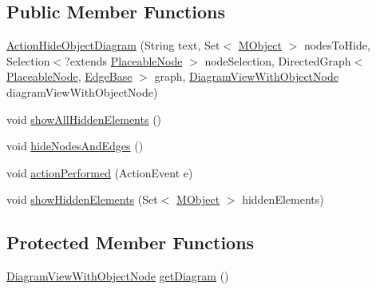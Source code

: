\subsection*{Public Member Functions}
\begin{DoxyCompactItemize}
\item 
\hyperlink{classorg_1_1tzi_1_1use_1_1gui_1_1views_1_1diagrams_1_1event_1_1_action_hide_object_diagram_a8614209b4a144d41e3dae415879e2226}{Action\-Hide\-Object\-Diagram} (String text, Set$<$ \hyperlink{interfaceorg_1_1tzi_1_1use_1_1uml_1_1sys_1_1_m_object}{M\-Object} $>$ nodes\-To\-Hide, Selection$<$?extends \hyperlink{classorg_1_1tzi_1_1use_1_1gui_1_1views_1_1diagrams_1_1elements_1_1_placeable_node}{Placeable\-Node} $>$ node\-Selection, Directed\-Graph$<$ \hyperlink{classorg_1_1tzi_1_1use_1_1gui_1_1views_1_1diagrams_1_1elements_1_1_placeable_node}{Placeable\-Node}, \hyperlink{classorg_1_1tzi_1_1use_1_1gui_1_1views_1_1diagrams_1_1elements_1_1edges_1_1_edge_base}{Edge\-Base} $>$ graph, \hyperlink{classorg_1_1tzi_1_1use_1_1gui_1_1views_1_1diagrams_1_1_diagram_view_with_object_node}{Diagram\-View\-With\-Object\-Node} diagram\-View\-With\-Object\-Node)
\item 
void \hyperlink{classorg_1_1tzi_1_1use_1_1gui_1_1views_1_1diagrams_1_1event_1_1_action_hide_object_diagram_a40f59bfa91bc40067c57204638af7f9b}{show\-All\-Hidden\-Elements} ()
\item 
void \hyperlink{classorg_1_1tzi_1_1use_1_1gui_1_1views_1_1diagrams_1_1event_1_1_action_hide_object_diagram_a06a6a6e0e7c766f56fffc96869aac740}{hide\-Nodes\-And\-Edges} ()
\item 
void \hyperlink{classorg_1_1tzi_1_1use_1_1gui_1_1views_1_1diagrams_1_1event_1_1_action_hide_object_diagram_a37e49782d961fa2283ab28878a30612f}{action\-Performed} (Action\-Event e)
\item 
void \hyperlink{classorg_1_1tzi_1_1use_1_1gui_1_1views_1_1diagrams_1_1event_1_1_action_hide_object_diagram_afe29c95a8637cee7e7a68596a0ec8b2f}{show\-Hidden\-Elements} (Set$<$ \hyperlink{interfaceorg_1_1tzi_1_1use_1_1uml_1_1sys_1_1_m_object}{M\-Object} $>$ hidden\-Elements)
\end{DoxyCompactItemize}
\subsection*{Protected Member Functions}
\begin{DoxyCompactItemize}
\item 
\hyperlink{classorg_1_1tzi_1_1use_1_1gui_1_1views_1_1diagrams_1_1_diagram_view_with_object_node}{Diagram\-View\-With\-Object\-Node} \hyperlink{classorg_1_1tzi_1_1use_1_1gui_1_1views_1_1diagrams_1_1event_1_1_action_hide_object_diagram_ada2b4c1312a72bf842bc2abd153e812b}{get\-Diagram} ()
\end{DoxyCompactItemize}



